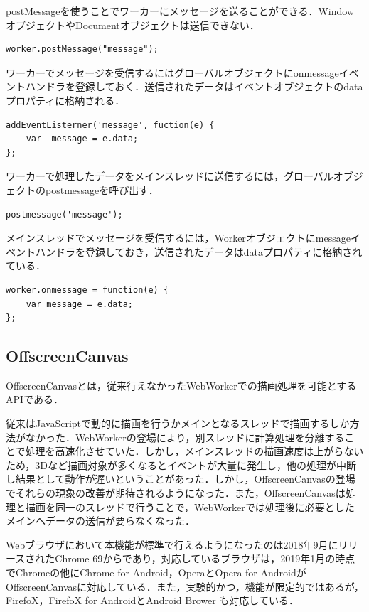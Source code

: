 \documentclass[a4j,12pt]{jsarticle}
\begin{document}
postMessageを使うことでワーカーにメッセージを送ることができる．WindowオブジェクトやDocumentオブジェクトは送信できない．
\begin{lstlisting}[basicstyle=\ttfamily\footnotesize, frame=single]
worker.postMessage("message");
 \end{lstlisting}

ワーカーでメッセージを受信するにはグローバルオブジェクトにonmessageイベントハンドラを登録しておく．送信されたデータはイベントオブジェクトのdataプロパティに格納される．
\begin{lstlisting}[basicstyle=\ttfamily\footnotesize, frame=single]
addEventListerner('message', fuction(e) { 
	var  message = e.data;
};
 \end{lstlisting}

ワーカーで処理したデータをメインスレッドに送信するには，グローバルオブジェクトのpostmessageを呼び出す．
\begin{lstlisting}[basicstyle=\ttfamily\footnotesize, frame=single]
postmessage('message');
 \end{lstlisting}

メインスレッドでメッセージを受信するには，Workerオブジェクトにmessageイベントハンドラを登録しておき，送信されたデータはdataプロパティに格納されている．
\begin{lstlisting}[basicstyle=\ttfamily\footnotesize, frame=single]
worker.onmessage = function(e) {
	var message = e.data;
};
 \end{lstlisting}

\subsection{OffscreenCanvas}
OffscreenCanvasとは，従来行えなかったWebWorkerでの描画処理を可能とするAPIである．

従来はJavaScriptで動的に描画を行うかメインとなるスレッドで描画するしか方法がなかった．WebWorkerの登場により，別スレッドに計算処理を分離することで処理を高速化させていた．しかし，メインスレッドの描画速度は上がらないため，3Dなど描画対象が多くなるとイベントが大量に発生し，他の処理が中断し結果として動作が遅いということがあった．しかし，OffscreenCanvasの登場でそれらの現象の改善が期待されるようになった．また，OffscreenCanvasは処理と描画を同一のスレッドで行うことで，WebWorkerでは処理後に必要としたメインへデータの送信が要らなくなった．

Webブラウザにおいて本機能が標準で行えるようになったのは2018年9月にリリースされたChrome 69からであり，対応しているブラウザは，2019年1月の時点でChromeの他にChrome for Android，OperaとOpera for AndroidがOffscreenCanvasに対応している．また，実験的かつ，機能が限定的ではあるが，FirefoX，FirefoX for AndroidとAndroid Brower も対応している．
\end{document}
